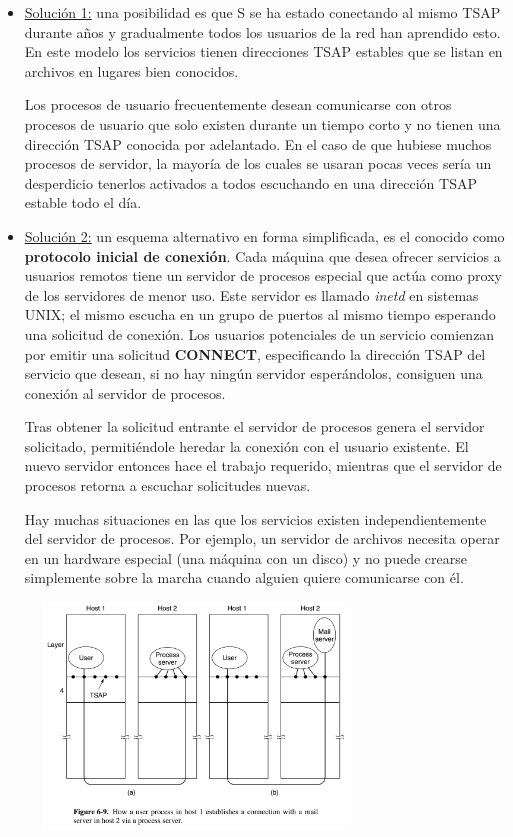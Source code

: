 \documentclass[10pt,a4paper]{report}
\begin{document}
\begin{itemize}
	\item \underline{Solución 1:} una posibilidad es que S se ha estado conectando al 
	mismo TSAP durante años y gradualmente todos los usuarios de la red han 
	aprendido esto. En este modelo los servicios tienen direcciones TSAP estables que 
	se listan en archivos en lugares bien conocidos.
	\par Los procesos de usuario frecuentemente desean comunicarse con otros 
	procesos de usuario que solo existen durante un tiempo corto y no tienen una 
	dirección TSAP conocida por adelantado. En el caso de que hubiese muchos 
	procesos de servidor, la mayoría de los cuales se usaran pocas veces sería un 
	desperdicio tenerlos activados a todos escuchando en una dirección TSAP estable 
	todo el día.
	\item \underline{Solución 2:} un esquema alternativo en forma simplificada, es el 
	conocido como \textbf{protocolo inicial de conexión}. Cada máquina que desea 
	ofrecer servicios a usuarios remotos tiene un servidor de procesos especial que 
	actúa como 	proxy de los servidores de menor uso. Este servidor es llamado 
	\textit{inetd} en sistemas UNIX; el mismo escucha en un grupo de puertos al mismo 
	tiempo esperando una solicitud de conexión. Los usuarios potenciales de un 
	servicio comienzan por emitir una solicitud 	\textbf{CONNECT}, especificando la 
	dirección	TSAP del servicio que desean, si no hay ningún servidor esperándolos, 
	consiguen una conexión al servidor de procesos.
	 \par Tras obtener la solicitud entrante el servidor de procesos genera el servidor 
	 solicitado, permitiéndole heredar la conexión con el usuario existente. El nuevo 
	 servidor entonces hace el trabajo requerido, mientras que el servidor de procesos 
	 retorna a escuchar solicitudes nuevas.
	\par Hay muchas situaciones en las que los servicios existen independientemente 
	del servidor de procesos. Por ejemplo, un servidor de archivos necesita operar en un 
	hardware especial (una máquina con un disco) y no puede crearse simplemente 
	sobre la marcha cuando alguien quiere comunicarse con él.
	
	\begin{center}
	\includegraphics[width=9cm, height=6cm]{./imagenes/conexioninicial.png} 
	\end{center}


\end{itemize}
\end{document}
